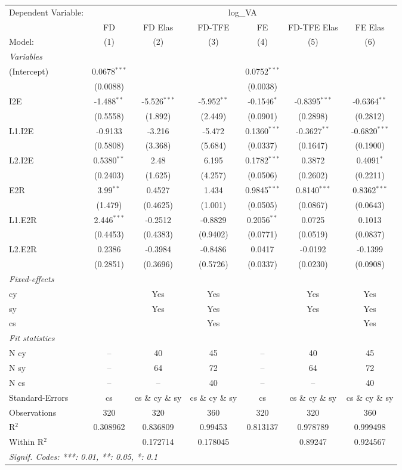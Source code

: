 \begin{tabular}{lcccccc}
Dependent Variable:&\multicolumn{6}{c}{log\_VA}\\
  & FD & FD Elas & FD-TFE & FE & FD-TFE Elas & FE Elas\\
Model:&(1) & (2) & (3) & (4) & (5) & (6)\\
\midrule \emph{Variables}&   &   &   &   &   &  \\
(Intercept)&0.0678$^{***}$ &    &    & 0.0752$^{***}$ &    &   \\
  &(0.0088) &    &    & (0.0038) &    &   \\
I2E&-1.488$^{**}$ & -5.526$^{***}$ & -5.952$^{**}$ & -0.1546$^{*}$ & -0.8395$^{***}$ & -0.6364$^{**}$\\
  &(0.5558) & (1.892) & (2.449) & (0.0901) & (0.2898) & (0.2812)\\
L1.I2E&-0.9133 & -3.216 & -5.472 & 0.1360$^{***}$ & -0.3627$^{**}$ & -0.6820$^{***}$\\
  &(0.5808) & (3.368) & (5.684) & (0.0337) & (0.1647) & (0.1900)\\
L2.I2E&0.5380$^{**}$ & 2.48 & 6.195 & 0.1782$^{***}$ & 0.3872 & 0.4091$^{*}$\\
  &(0.2403) & (1.625) & (4.257) & (0.0506) & (0.2602) & (0.2211)\\
E2R&3.99$^{**}$ & 0.4527 & 1.434 & 0.9845$^{***}$ & 0.8140$^{***}$ & 0.8362$^{***}$\\
  &(1.479) & (0.4625) & (1.001) & (0.0505) & (0.0867) & (0.0643)\\
L1.E2R&2.446$^{***}$ & -0.2512 & -0.8829 & 0.2056$^{**}$ & 0.0725 & 0.1013\\
  &(0.4453) & (0.4383) & (0.9402) & (0.0771) & (0.0519) & (0.0837)\\
L2.E2R&0.2386 & -0.3984 & -0.8486 & 0.0417 & -0.0192 & -0.1399\\
  &(0.2851) & (0.3696) & (0.5726) & (0.0337) & (0.0230) & (0.0908)\\
\midrule \emph{Fixed-effects}&   &   &   &   &   &  \\
cy &  & Yes & Yes &  & Yes & Yes\\
sy &  & Yes & Yes &  & Yes & Yes\\
cs &  &  & Yes &  &  & Yes\\
\midrule \emph{Fit statistics}&  & & & & & \\
N cy & -- & 40 & 45 & -- & 40 & 45\\
N sy & -- & 64 & 72 & -- & 64 & 72\\
N cs & -- & -- & 40 & -- & -- & 40\\
Standard-Errors& cs&cs \& cy \& sy&cs \& cy \& sy&cs&cs \& cy \& sy&cs \& cy \& sy\\
Observations & 320&320&360&320&320&360\\
R$^2$ & 0.308962&0.836809&0.99453&0.813137&0.978789&0.999498\\
Within R$^2$ & &0.172714&0.178045&&0.89247&0.924567\\
\multicolumn{7}{l}{\emph{Signif. Codes: ***: 0.01, **: 0.05, *: 0.1}}\\
\end{tabular}


